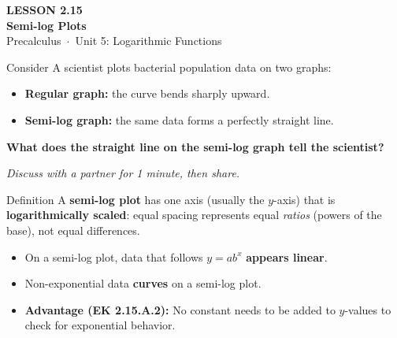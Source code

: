 \documentclass[aspectratio=169, 11pt]{beamer}
\begin{document}
{
\begin{frame}[plain]
  \vspace{2.8cm}\hspace{0.55cm}%
  \begin{minipage}{0.9\textwidth}
    {\color{goldacc}\bfseries\small LESSON 2.15}\\[0.5cm]
    {\color{white}\bfseries\LARGE Semi-log Plots}\\[1.2cm]
    {\color{skymid}\small Precalculus~$\cdot$~Unit 5: Logarithmic Functions}
  \end{minipage}
\end{frame}
}

\begin{frame}[t, plain]
  \vspace{0.3cm}
  \begin{block}{Consider}
    A scientist plots bacterial population data on two graphs:
    \begin{itemize}
      \item \textbf{Regular graph:} the curve bends sharply upward.
      \item \textbf{Semi-log graph:} the same data forms a perfectly straight line.
    \end{itemize}
    \vspace{0.2cm}
    \textbf{What does the straight line on the semi-log graph tell the scientist?}
  \end{block}
  \vspace{0.4cm}
  \textit{Discuss with a partner for 1 minute, then share.}
\end{frame}

\begin{frame}[t, plain]
  \vspace{0.2cm}
  \begin{block}{Definition}
    A \textbf{semi-log plot} has one axis (usually the $y$-axis) that is
    \textbf{logarithmically scaled}: equal spacing represents equal \emph{ratios}
    (powers of the base), not equal differences.
  \end{block}
  \vspace{0.3cm}
  \begin{itemize}
    \setlength{\itemsep}{8pt}
    \item On a semi-log plot, data that follows $y = ab^x$ \textbf{appears linear}.
    \item Non-exponential data \textbf{curves} on a semi-log plot.
    \item \textbf{Advantage (EK 2.15.A.2):} No constant needs to be added to $y$-values
          to check for exponential behavior.
  \end{itemize}
\end{frame}
\end{document}
